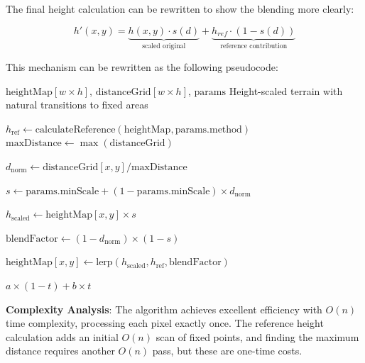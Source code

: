 The final height calculation can be rewritten to show the blending more clearly:

\begin{equation}
h'(x, y) = \underbrace{h(x, y) \cdot s(d)}_{\text{scaled original}} + 
           \underbrace{h_{ref} \cdot (1 - s(d))}_{\text{reference contribution}}
\end{equation}

This mechanism can be rewritten as the following pseudocode:

\begin{algorithm}[H]
\small
\caption{Distance-Based Height Scaling}
\label{alg:height_scaling}
\begin{algorithmic}[1]
\Require $\text{heightMap}[w \times h]$, $\text{distanceGrid}[w \times h]$, $\text{params}$
\Ensure Height-scaled terrain with natural transitions to fixed areas

\State $h_{\text{ref}} \gets \text{calculateReference}(\text{heightMap}, \text{params.method})$
\State $\text{maxDistance} \gets \max(\text{distanceGrid})$

    \State $d_{\text{norm}} \gets \text{distanceGrid}[x,y] / \text{maxDistance}$
    
    \State $s \gets \text{params.minScale} + (1 - \text{params.minScale}) \times d_{\text{norm}}$
    
    \State $h_{\text{scaled}} \gets \text{heightMap}[x,y] \times s$
    
    \State $\text{blendFactor} \gets (1 - d_{\text{norm}}) \times (1 - s)$
    
    \State $\text{heightMap}[x,y] \gets \text{lerp}(h_{\text{scaled}}, h_{\text{ref}}, \text{blendFactor})$
\EndFor

    \State \Return $a \times (1 - t) + b \times t$
\EndFunction
\end{algorithmic}
\end{algorithm}

\textbf{Complexity Analysis}: The algorithm achieves excellent efficiency with $O(n)$ time complexity, processing each pixel exactly once. The reference height calculation adds an initial $O(n)$ scan of fixed points, and finding the maximum distance requires another $O(n)$ pass, but these are one-time costs. 

